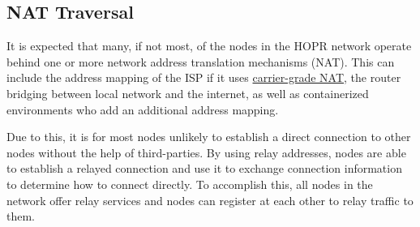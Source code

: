 \subsection{NAT Traversal}

It is expected that many, if not most, of the nodes in the HOPR network operate behind one or more network address translation mechanisms (NAT). This can include the address mapping of the ISP if it uses \href{https://en.wikipedia.org/wiki/Carrier-grade_NAT}{carrier-grade NAT}, the router bridging between local network and the internet, as well as containerized environments who add an additional address mapping.

Due to this, it is for most nodes unlikely to establish a direct connection to other nodes without the help of third-parties. By using relay addresses, nodes are able to establish a relayed connection and use it to exchange connection information to determine how to connect directly. To accomplish this, all nodes in the network offer relay services and nodes can register at each other to relay traffic to them.

